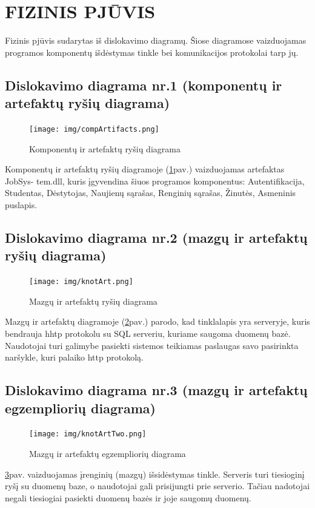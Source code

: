 \documentclass{VUMIFPSkursinis}
\begin{document}
\newpage
\section{FIZINIS PJŪVIS}
Fizinis pjūvis sudarytas iš dislokavimo diagramų. Šiose diagramose vaizduojamas programos komponentų išdėstymas tinkle bei komunikacijos protokolai tarp jų. 
\subsection{Dislokavimo diagrama nr.1 (komponentų ir artefaktų ryšių diagrama)}
\begin{figure}[H]
	\centering
	\texttt{[image: img/compArtifacts.png]}
	\caption{Komponentų ir artefaktų ryšių diagrama}
	\label{fig:compOne}
\end{figure}
Komponentų ir artefaktų ryšių diagramoje (\ref{fig:compOne}pav.) vaizduojamas artefaktas JobSys- tem.dll, kuris įgyvendina šiuos programos komponentus: Autentifikacija, Studentas, Dėstytojas, Naujienų sąrašas, Renginių sąrašas, Žinutės, Asmeninis puslapis.
\subsection{Dislokavimo diagrama nr.2 (mazgų ir artefaktų ryšių diagrama)}
\begin{figure}[H]
	\centering
	\texttt{[image: img/knotArt.png]}
	\caption{Mazgų ir artefaktų ryšių diagrama}
	\label{fig:compTwo}
\end{figure}
Mazgų ir artefaktų diagramoje (\ref{fig:compTwo}pav.) parodo, kad tinklalapis yra serveryje, kuris bendrauja hhtp protokolu su SQL serveriu, kuriame saugoma duomenų bazė. Naudotojai turi galimybe pasiekti sistemos teikiamas paslaugas savo pasirinkta naršykle, kuri palaiko http protokolą.
\subsection{Dislokavimo diagrama nr.3 (mazgų ir artefaktų egzempliorių diagrama)}
\begin{figure}[H]
	\centering
	\texttt{[image: img/knotArtTwo.png]}
	\caption{Mazgų ir artefaktų egzempliorių diagrama}
	\label{fig:compThree}
\end{figure}
\ref{fig:compThree}pav. vaizduojamas įrenginių (mazgų) išsidėstymas tinkle. Serveris turi tiesioginį ryšį su duomenų baze, o naudotojai gali prisijungti prie serverio. Tačiau nadotojai negali tiesiogiai pasiekti duomenų bazės ir joje saugomų duomenų.
\newpage
\end{document}
